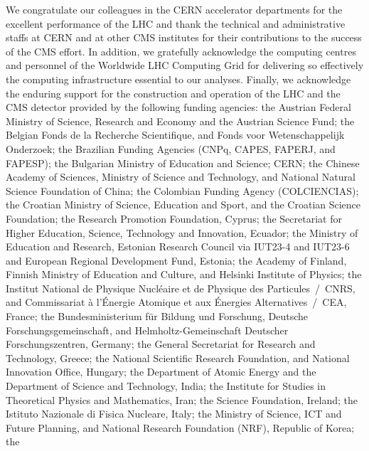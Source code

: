 \begin{acknowledgments}


  We congratulate our colleagues in the CERN accelerator departments
  for the excellent performance of the LHC and thank the technical and
  administrative staffs at CERN and at other CMS institutes for their
  contributions to the success of the CMS effort. In addition, we
  gratefully acknowledge the computing centres and personnel of the
  Worldwide LHC Computing Grid for delivering so effectively the
  computing infrastructure essential to our analyses. Finally, we
  acknowledge the enduring support for the construction and operation
  of the LHC and the CMS detector provided by the following funding
  agencies: the Austrian Federal Ministry of Science, Research and
  Economy and the Austrian Science Fund; the Belgian Fonds de la
  Recherche Scientifique, and Fonds voor Wetenschappelijk Onderzoek;
  the Brazilian Funding Agencies (CNPq, CAPES, FAPERJ, and FAPESP);
  the Bulgarian Ministry of Education and Science; CERN; the Chinese
  Academy of Sciences, Ministry of Science and Technology, and
  National Natural Science Foundation of China; the Colombian Funding
  Agency (COLCIENCIAS); the Croatian Ministry of Science, Education
  and Sport, and the Croatian Science Foundation; the Research
  Promotion Foundation, Cyprus; the Secretariat for Higher Education,
  Science, Technology and Innovation, Ecuador; the Ministry of
  Education and Research, Estonian Research Council via IUT23-4 and
  IUT23-6 and European Regional Development Fund, Estonia; the Academy
  of Finland, Finnish Ministry of Education and Culture, and Helsinki
  Institute of Physics; the Institut National de Physique Nucl\'eaire
  et de Physique des Particules~/~CNRS, and Commissariat \`a
  l'\'Energie Atomique et aux \'Energies Alternatives~/~CEA, France;
  the Bundesministerium f\"ur Bildung und Forschung, Deutsche
  Forschungsgemeinschaft, and Helmholtz-Gemeinschaft Deutscher
  Forschungszentren, Germany; the General Secretariat for Research and
  Technology, Greece; the National Scientific Research Foundation, and
  National Innovation Office, Hungary; the Department of Atomic Energy
  and the Department of Science and Technology, India; the Institute
  for Studies in Theoretical Physics and Mathematics, Iran; the
  Science Foundation, Ireland; the Istituto Nazionale di Fisica
  Nucleare, Italy; the Ministry of Science, ICT and Future Planning,
  and National Research Foundation (NRF), Republic of Korea; the

\end{acknowledgments}
